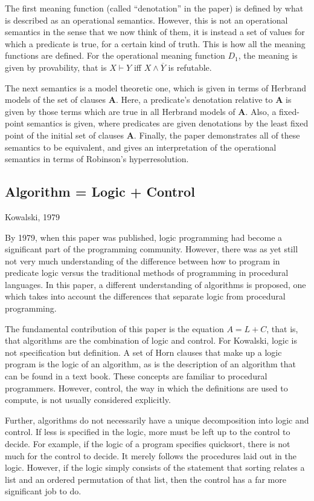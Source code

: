 \documentclass[12pt]{article}
\begin{document}
The first meaning function (called ``denotation'' in the paper) is
defined by what is described as an operational semantics.  However,
this is not an operational semantics in the sense that we now think of
them, it is instead a set of values for which a predicate is true, for
a certain kind of truth.  This is how all the meaning functions are
defined.  For the operational meaning function $D_1$, the meaning is
given by provability, that is $X\vdash Y$ iff $X \wedge \overline{Y}$
is refutable.  

The next semantics is a model theoretic one, which is given in terms
of Herbrand models of the set of clauses ${\mathbf A}$.  Here, a
predicate's denotation relative to ${\mathbf A}$ is given by those
terms which are true in all Herbrand models of ${\mathbf A}$.  Also, a
fixed-point semantics is given, where predicates are given denotations
by the least fixed point of the initial set of clauses ${\mathbf A}$.
Finally, the paper demonstrates all of these semantics to be
equivalent, and gives an interpretation of the operational semantics
in terms of Robinson's hyperresolution.   

\subsection*{Algorithm = Logic + Control}
Kowalski, 1979 \cite{kow79}

By 1979, when this paper was published, logic programming had become a
significant part of the programming community.  However, there was as
yet still not very much understanding of the difference between how to
program in predicate logic versus the traditional methods of
programming in procedural languages.  In this paper, a different
understanding of algorithms is proposed, one which takes into account
the differences that separate logic from procedural programming.  

The fundamental contribution of this paper is the equation $A = L +
C$, that is, that algorithms are the combination of logic and
control.  For Kowalski, logic is not specification but definition.  A
set of Horn clauses that make up a logic program is the logic of an
algorithm, as is the description of an algorithm that can be found in
a text book.  These concepts are familiar to procedural programmers.
However, control, the way in which the definitions are used to
compute, is not usually considered explicitly.  

Further, algorithms do not necessarily have a unique decomposition
into logic and control.  If less is specified in the logic, more must
be left up to the control to decide.  For example, if the logic of a
program specifies quicksort, there is not much for the control to
decide.  It merely follows the procedures laid out in the logic.
However, if the logic simply consists of the statement that sorting
relates a list and an ordered permutation of that list, then the
control has a far more significant job to do.  
\end{document}
